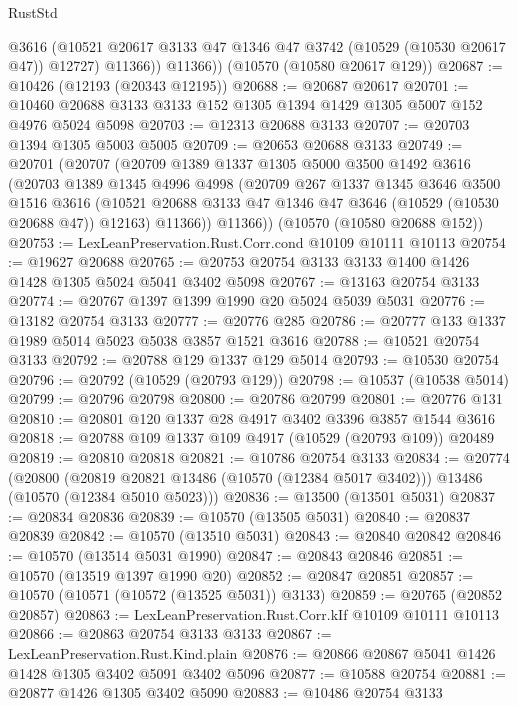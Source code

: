 \begin{lexlean}{RustStd}
\begin{coremodule}
            @3616
            (@10521 @20617 @3133 @47 @1346 @47 @3742 (@10529 (@10530 @20617 @47)) @12727)
            @11366))
        @11366))
    (@10570 (@10580 @20617 @129))
@20687 := @10426 (@12193 (@20343 @12195))
@20688 := @20687 @20617
@20701 := @10460 @20688 @3133 @3133 @152 @1305 @1394 @1429 @1305 @5007 @152 @4976 @5024 @5098
@20703 := @12313 @20688 @3133
@20707 := @20703 @1394 @1305 @5003 @5005
@20709 := @20653 @20688 @3133
@20749 := @20701
    (@20707
      (@20709
        @1389
        @1337
        @1305
        @5000
        @3500
        @1492
        @3616
        (@20703
          @1389
          @1345
          @4996
          @4998
          (@20709
            @267
            @1337
            @1345
            @3646
            @3500
            @1516
            @3616
            (@10521 @20688 @3133 @47 @1346 @47 @3646 (@10529 (@10530 @20688 @47)) @12163)
            @11366))
        @11366))
    (@10570 (@10580 @20688 @152))
@20753 := LexLeanPreservation.Rust.Corr.cond @10109 @10111 @10113
@20754 := @19627 @20688
@20765 := @20753 @20754 @3133 @3133 @1400 @1426 @1428 @1305 @5024 @5041 @3402 @5098
@20767 := @13163 @20754 @3133
@20774 := @20767 @1397 @1399 @1990 @20 @5024 @5039 @5031
@20776 := @13182 @20754 @3133
@20777 := @20776 @285
@20786 := @20777 @133 @1337 @1989 @5014 @5023 @5038 @3857 @1521 @3616
@20788 := @10521 @20754 @3133
@20792 := @20788 @129 @1337 @129 @5014
@20793 := @10530 @20754
@20796 := @20792 (@10529 (@20793 @129))
@20798 := @10537 (@10538 @5014)
@20799 := @20796 @20798
@20800 := @20786 @20799
@20801 := @20776 @131
@20810 := @20801 @120 @1337 @28 @4917 @3402 @3396 @3857 @1544 @3616
@20818 := @20788 @109 @1337 @109 @4917 (@10529 (@20793 @109)) @20489
@20819 := @20810 @20818
@20821 := @10786 @20754 @3133
@20834 := @20774
    (@20800
      (@20819 @20821 @13486 (@10570 (@12384 @5017 @3402)))
      @13486
      (@10570 (@12384 @5010 @5023)))
@20836 := @13500 (@13501 @5031)
@20837 := @20834 @20836
@20839 := @10570 (@13505 @5031)
@20840 := @20837 @20839
@20842 := @10570 (@13510 @5031)
@20843 := @20840 @20842
@20846 := @10570 (@13514 @5031 @1990)
@20847 := @20843 @20846
@20851 := @10570 (@13519 @1397 @1990 @20)
@20852 := @20847 @20851
@20857 := @10570 (@10571 (@10572 (@13525 @5031)) @3133)
@20859 := @20765 (@20852 @20857)
@20863 := LexLeanPreservation.Rust.Corr.kIf @10109 @10111 @10113
@20866 := @20863 @20754 @3133 @3133
@20867 := LexLeanPreservation.Rust.Kind.plain
@20876 := @20866 @20867 @5041 @1426 @1428 @1305 @3402 @5091 @3402 @5096
@20877 := @10588 @20754
@20881 := @20877 @1426 @1305 @3402 @5090
@20883 := @10486 @20754 @3133

\end{coremodule}
\end{lexlean}
